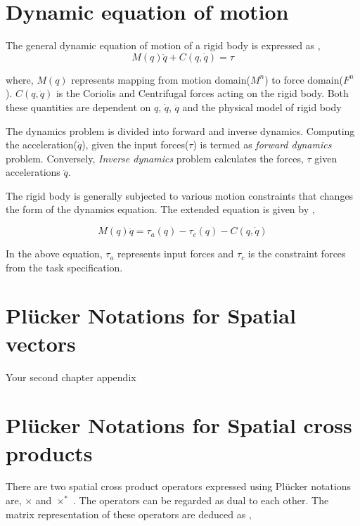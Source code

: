 \chapter{Dynamic equation of motion}\label{chap:dynamic}
The general dynamic equation of motion of a rigid body is expressed as \cite{featherstone2014rigid} \cite{shakhimardanov2015composable}, 
\begin{equation}
	\label{eq:dynamic}
	M(q)\ddot{q} + C(q, \dot{q}) = \tau 
\end{equation}

where, $M(q)$ represents mapping from motion domain($M^n$) to force domain($F^n$). $C(q, \dot{q})$ is the Coriolis and Centrifugal forces acting on the rigid body. Both these quantities are dependent on $q$, $\dot{q}$, $\ddot{q}$ and the physical model of rigid body \cite{featherstone2014rigid}

The dynamics problem is divided into forward and inverse dynamics. Computing the acceleration($\ddot{q}$), given the input forces($\tau$) is termed as \textit{forward dynamics} problem. Conversely, \textit{Inverse dynamics} problem calculates the forces, $\tau$ given accelerations $\ddot{q}$.

The rigid body is generally subjected to various motion constraints that changes the form of the dynamics equation. The extended equation is given by \cite{shakhimardanov2015composable},

\begin{equation}
\label{eq:extendeddynamic}
M(q)\ddot{q} = \tau_a(q) - \tau_c(q) -  C(q, \dot{q})
\end{equation}

In the above equation, $\tau_a$ represents input forces and $\tau_c$ is the constraint forces from the task specification.

\chapter{Pl{\"u}cker Notations for Spatial vectors}\label{chap:plucker}
Your second chapter appendix

\chapter{Pl{\"u}cker Notations for Spatial cross products}\label{chap:cross}

There are two spatial cross product operators expressed using Pl{\"u}cker notations are, $\times$ and $\times^*$ \cite{featherstone2014rigid}. The operators can be regarded as dual to each other. The matrix representation of these operators are deduced as \cite{featherstone2014rigid},

